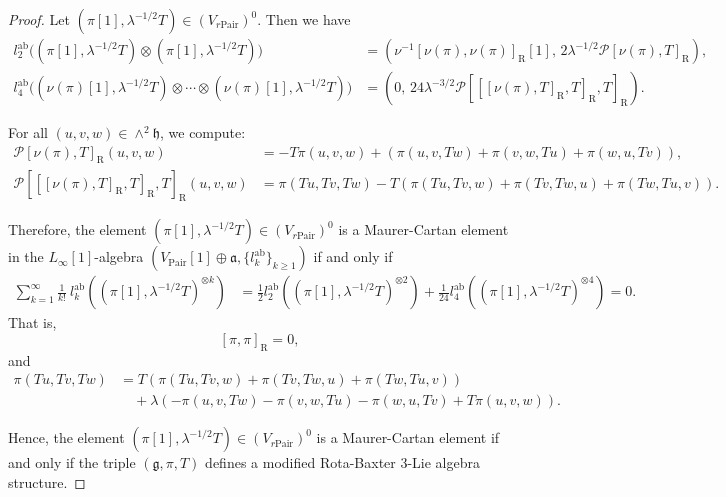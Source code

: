 \documentclass[12pt]{amsart}
\theoremstyle{definition}
\begin{document}
\begin{proof}
	Let $(\pi[1], \lambda^{-1/2}T) \in (V_{r\mathrm{Pair}})^0$. Then we have
	\begin{align*}
		l^{\mathrm{ab}}_2\big( (\pi[1], \lambda^{-1/2}T) \otimes (\pi[1], \lambda^{-1/2}T) \big)
		&= \left( \nu^{-1}[\nu(\pi), \nu(\pi)]_{\mathrm{R}}[1],\, 2\lambda^{-1/2} \mathcal{P}[\nu(\pi), T]_{\mathrm{R}} \right), \\
		l^{\mathrm{ab}}_4\big( (\nu(\pi)[1], \lambda^{-1/2}T)\otimes \cdots\otimes (\nu(\pi)[1], \lambda^{-1/2}T) \big)
		&= \left( 0,\, 24\lambda^{-3/2} \mathcal{P}[[[\nu(\pi), T]_{\mathrm{R}}, T]_{\mathrm{R}}, T]_{\mathrm{R}} \right).
	\end{align*}
	
	For all $(u,v,w) \in \wedge^2 \mathfrak{h}$, we compute:
	\begin{align*}
		\mathcal{P}[\nu(\pi), T]_{\mathrm{R}}(u,v,w)
		&= - T\pi(u,v,w)
		+ \left( \pi(u,v,Tw) + \pi(v,w,Tu) + \pi(w,u,Tv) \right), \\
		\mathcal{P}[[[\nu(\pi),T]_{\mathrm{R}},T]_{\mathrm{R}},T]_{\mathrm{R}}(u,v,w)
		&=  \pi(Tu,Tv,Tw)
		- T\left( \pi(Tu,Tv,w) + \pi(Tv,Tw,u) + \pi(Tw,Tu,v) \right).
	\end{align*}
	
	Therefore, the element $(\pi[1], \lambda^{-1/2}T) \in (V_{r\mathrm{Pair}})^0$ is a Maurer-Cartan element in the $L_\infty[1]$-algebra $(V_{\mathrm{Pair}}[1] \oplus \mathfrak{a}, \{l^{\mathrm{ab}}_k\}_{k\geq 1})$ if and only if
	\begin{align*}
		\sum_{k=1}^\infty \frac{1}{k!}~ l^{\mathrm{ab}}_k \left( (\pi[1], \lambda^{-1/2}T)^{\otimes k} \right)
		&= \frac{1}{2} l^{\mathrm{ab}}_2\left( (\pi[1], \lambda^{-1/2}T)^{\otimes 2} \right)
		+ \frac{1}{24} l^{\mathrm{ab}}_4\left( (\pi[1], \lambda^{-1/2}T)^{\otimes 4} \right) = 0.
	\end{align*}
	That is,
	\[
	[\pi, \pi]_{\mathrm{R}} = 0,
	\]
	and
	\begin{align*}
		\pi(Tu,Tv,Tw)
		&= T\left( \pi(Tu,Tv,w) + \pi(Tv,Tw,u) + \pi(Tw,Tu,v) \right) \\
		&\quad + \lambda\left( -\pi(u,v,Tw) - \pi(v,w,Tu) - \pi(w,u,Tv) + T\pi(u,v,w) \right).
	\end{align*}
	
	Hence, the element $(\pi[1], \lambda^{-1/2}T) \in (V_{r\mathrm{Pair}})^0$ is a Maurer-Cartan element if and only if the triple $\left( \mathfrak{g}, \pi, T \right)$ defines a modified Rota-Baxter 3-Lie algebra structure.
\end{proof}
\end{document}

